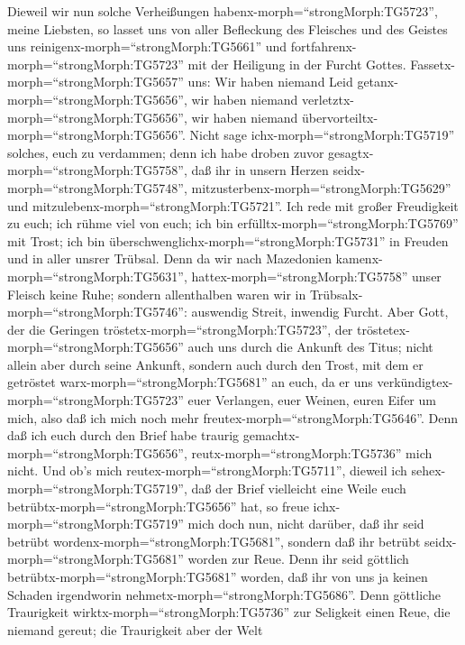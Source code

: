  Dieweil wir nun solche Verheißungen
habenx-morph=``strongMorph:TG5723'', meine Liebsten, so lasset uns von
aller Befleckung des Fleisches und des Geistes uns
reinigenx-morph=``strongMorph:TG5661'' und
fortfahrenx-morph=``strongMorph:TG5723'' mit der Heiligung in der Furcht
Gottes.  Fassetx-morph=``strongMorph:TG5657'' uns: Wir haben
niemand Leid getanx-morph=``strongMorph:TG5656'', wir haben niemand
verletztx-morph=``strongMorph:TG5656'', wir haben niemand
übervorteiltx-morph=``strongMorph:TG5656''.  Nicht sage
ichx-morph=``strongMorph:TG5719'' solches, euch zu verdammen; denn ich
habe droben zuvor gesagtx-morph=``strongMorph:TG5758'', daß ihr in
unsern Herzen seidx-morph=``strongMorph:TG5748'',
mitzusterbenx-morph=``strongMorph:TG5629'' und
mitzulebenx-morph=``strongMorph:TG5721''.  Ich rede mit
großer Freudigkeit zu euch; ich rühme viel von euch; ich bin
erfülltx-morph=``strongMorph:TG5769'' mit Trost; ich bin
überschwenglichx-morph=``strongMorph:TG5731'' in Freuden und in aller
unsrer Trübsal.  Denn da wir nach Mazedonien
kamenx-morph=``strongMorph:TG5631'', hattex-morph=``strongMorph:TG5758''
unser Fleisch keine Ruhe; sondern allenthalben waren wir in
Trübsalx-morph=``strongMorph:TG5746'': auswendig Streit, inwendig
Furcht.  Aber Gott, der die Geringen
tröstetx-morph=``strongMorph:TG5723'', der
tröstetex-morph=``strongMorph:TG5656'' auch uns durch die Ankunft des
Titus;  nicht allein aber durch seine Ankunft, sondern auch
durch den Trost, mit dem er getröstet warx-morph=``strongMorph:TG5681''
an euch, da er uns verkündigtex-morph=``strongMorph:TG5723'' euer
Verlangen, euer Weinen, euren Eifer um mich, also daß ich mich noch mehr
freutex-morph=``strongMorph:TG5646''.  Denn daß ich euch
durch den Brief habe traurig gemachtx-morph=``strongMorph:TG5656'',
reutx-morph=``strongMorph:TG5736'' mich nicht. Und ob's mich
reutex-morph=``strongMorph:TG5711'', dieweil ich
sehex-morph=``strongMorph:TG5719'', daß der Brief vielleicht eine Weile
euch betrübtx-morph=``strongMorph:TG5656'' hat,  so freue
ichx-morph=``strongMorph:TG5719'' mich doch nun, nicht darüber, daß ihr
seid betrübt wordenx-morph=``strongMorph:TG5681'', sondern daß ihr
betrübt seidx-morph=``strongMorph:TG5681'' worden zur Reue. Denn ihr
seid göttlich betrübtx-morph=``strongMorph:TG5681'' worden, daß ihr von
uns ja keinen Schaden irgendworin nehmetx-morph=``strongMorph:TG5686''.
 Denn göttliche Traurigkeit
wirktx-morph=``strongMorph:TG5736'' zur Seligkeit einen Reue, die
niemand gereut; die Traurigkeit aber der Welt
